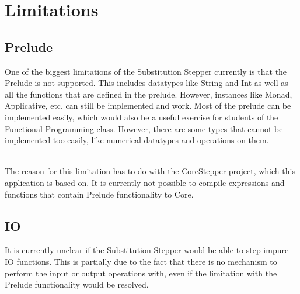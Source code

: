 \section{Limitations}

\subsection{Prelude}
One of the biggest limitations of the Substitution Stepper currently is that the Prelude is not supported.
This includes datatypes like String and Int as well as all the functions that are defined in the prelude.
However, instances like Monad, Applicative, etc. can still be implemented and work.
Most of the prelude can be implemented easily,
which would also be a useful exercise for students of the Functional Programming class.
However, there are some types that cannot be implemented too easily,
like numerical datatypes and operations on them.

\ \\
The reason for this limitation has to do with the CoreStepper project,
which this application is based on.
It is currently not possible to compile expressions and functions that contain Prelude functionality to Core.

\subsection{IO}
It is currently unclear if the Substitution Stepper would be able to step impure IO functions.
This is partially due to the fact that there is no mechanism to perform the input or output operations with,
even if the limitation with the Prelude functionality would be resolved.

